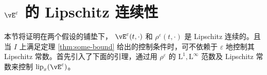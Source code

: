 
    



\section{\texorpdfstring{$\vE^{\varepsilon}$}{Lg} 的 Lipschitz 连续性}

本节将证明在两个假设的铺垫下， $\vE^{\varepsilon}(t, \cdot)$ 和 $\rho^{\varepsilon}(t, \cdot)$ 是 Lipschitz 连续的。且当 $I$ 上满足定理 \ref{thm:some-bound} 给出的控制条件时，可不依赖于 $\varepsilon$ 地控制其 Lipschitz 常数。首先引入了下面的引理，通过用 $\rho^\varepsilon$ 的 $\mathrm{L}^1,\mathrm{L}^\infty$ 范数及 Lipschitz 常数来控制 $\operatorname{lip}_x (\vE^\varepsilon)$。%

